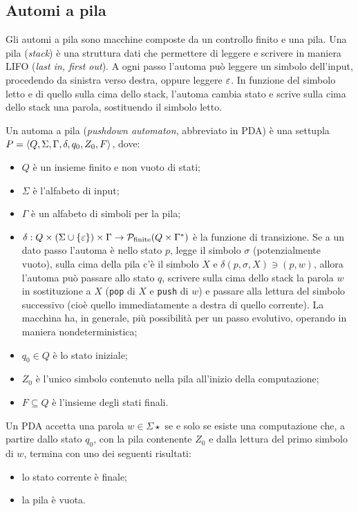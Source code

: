 \subsection{Automi a pila}
Gli automi a pila sono macchine composte da un controllo finito e una pila. Una pila (\emph{stack}) è una struttura dati che permettere di leggere e scrivere in maniera LIFO (\emph{last in, first out}). A ogni passo l'automa può leggere un simbolo dell'input, procedendo da sinistra verso destra, oppure leggere $\varepsilon$. In funzione del simbolo letto e di quello sulla cima dello stack, l'automa cambia stato e scrive sulla cima dello stack una parola, sostituendo il simbolo letto.
\begin{defin}
	Un automa a pila (\emph{pushdown automaton}, abbreviato in PDA) è una settupla $P=\langle Q,\Sigma,\Gamma,\delta,q_0,Z_0,F \rangle$, dove:
	\begin{itemize}
		\item $Q$ è un insieme finito e non vuoto di stati;
		\item $\Sigma$ è l'alfabeto di input;
		\item $\Gamma$ è un alfabeto di simboli per la pila;
		\item $\delta:Q\times(\Sigma\cup\left\{ \varepsilon \right\})\times\Gamma\to \mathcal P_{\text{finite}}(Q\times\Gamma^*)$ è la funzione di transizione. Se a un dato passo l'automa è nello stato $p$, legge il simbolo $\sigma$ (potenzialmente vuoto), sulla cima della pila c'è il simbolo $X$ e $\delta(p,\sigma,X)\ni (p,w)$, allora l'automa può passare allo stato $q$, scrivere sulla cima dello stack la parola $w$ in sostituzione a $X$ (\verb!pop! di $X$ e \verb!push! di $w$) e passare alla lettura del simbolo successivo (cioè quello immediatamente a destra di quello corrente). La macchina ha, in generale, più possibilità per un passo evolutivo, operando in maniera nondeterministica;
		\item $q_0\in Q$ è lo stato iniziale;
		\item $Z_0$ è l'unico simbolo contenuto nella pila all'inizio della computazione;
		\item $F\subseteq Q$ è l'insieme degli stati finali.
	\end{itemize}
	Un PDA accetta una parola $w\in\Sigma\star$ se e solo se esiste una computazione che, a partire dallo stato $q_0$, con la pila contenente $Z_0$ e dalla lettura del primo simbolo di $w$, termina con uno dei seguenti risultati:
	\begin{itemize}
		\item lo stato corrente è finale;
		\item la pila è vuota.
	\end{itemize}
\end{defin}

